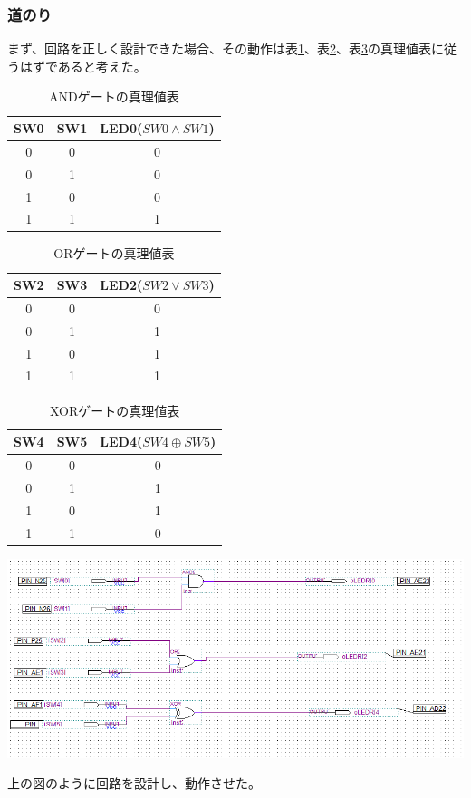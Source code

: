\documentclass[a4paper]{jarticle}
\begin{document}
\subsubsection{道のり}
まず、回路を正しく設計できた場合、その動作は表\ref{Report4ANDGate}、表\ref{Report4ORGate}、表\ref{Report4XORGate}の真理値表に従うはずであると考えた。
\begin{table}[ht]
	\begin{center}
		\caption{ANDゲートの真理値表}
		\label{Report4ANDGate}
		\begin{tabular}{|c|c|c|}				\hline
			SW0	&SW1	&LED0($SW0\land SW1$)\\	\hline\hline
			0	&0	&0\\				\hline
			0	&1	&0\\				\hline
			1	&0	&0\\				\hline
			1	&1	&1\\				\hline
		\end{tabular}
	\end{center}
\end{table}
\begin{table}[ht]
	\begin{center}
		\caption{ORゲートの真理値表}
		\label{Report4ORGate}
		\begin{tabular}{|c|c|c|}			\hline
			SW2	&SW3	&LED2($SW2\lor SW3$)\\	\hline\hline
			0	&0	&0\\			\hline
			0	&1	&1\\			\hline
			1	&0	&1\\			\hline
			1	&1	&1\\			\hline
		\end{tabular}
	\end{center}
\end{table}
\begin{table}[ht]
	\begin{center}
		\caption{XORゲートの真理値表}
		\label{Report4XORGate}
		\begin{tabular}{|c|c|c|}				\hline
			SW4	&SW5	&LED4($SW4\oplus SW5$)\\	\hline\hline
			0	&0	&0\\				\hline
			0	&1	&1\\				\hline
			1	&0	&1\\				\hline
			1	&1	&0\\				\hline
		\end{tabular}
	\end{center}
\end{table}
\begin{center}
	\includegraphics[width=15cm]{work4.PNG}
\end{center}
上の図のように回路を設計し、動作させた。
\end{document}
